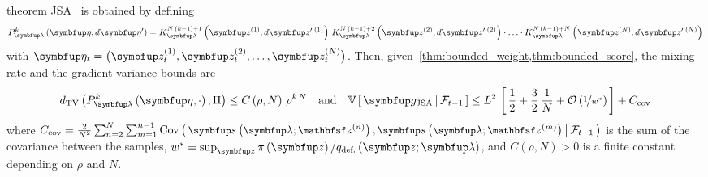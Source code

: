 
\begin{theoremEnd}{theorem}\label{thm:jsa}
  JSA~\citep{pmlr-v124-ou20a} is obtained by defining 
  {%
  \begin{align*}
  P_{\vlambda}^k\left(\veta, d\veta^{\prime}\right)
  = 
  K_{\vlambda}^{N\,\left(k-1\right) + 1}\left(\vz^{(1)}, d\vz^{\prime\;(1)}\right)
  \,
  K_{\vlambda}^{N\,\left(k-1\right) + 2}\left(\vz^{(2)}, d\vz^{\prime\;(2)}\right)
  \cdot
  \ldots 
  \cdot
  K_{\vlambda}^{N\,\left(k-1\right) + N}\left(\vz^{(N)}, d\vz^{\prime\;(N)}\right)
  \end{align*}
  }%
  with \(\veta_t = \big(\vz_t^{(1)}, \vz_t^{(2)}, \ldots, \vz_t^{(N)}\big)\).
  Then, given~\cref{thm:bounded_weight,thm:bounded_score}, the mixing rate and the gradient variance bounds are
  {%
  \begin{align*}
    \DTV{P_{\vlambda}^k\left(\veta, \cdot\right)}{\Pi}
    \leq
    C\left(\rho, N\right)\,{\rho}^{k\,N}
    \quad\text{and}\quad
    \V{ \vg_{\mathrm{JSA}} \,\middle|\, \mathcal{F}_{t-1} }
    \leq
    L^2 \,
    \left[\,
    \frac{1}{2} + \frac{3}{2}\,\frac{1}{N}
    + \mathcal{O}\left(\nicefrac{1}{w^*}\right)
    \,\right]
    +
    C_{\text{cov}}
  \end{align*}
  }%
  where
  \(\small\textstyle
  C_{\text{cov}} = \frac{2}{N^2} \sum^{N}_{n=2} \sum^{n-1}_{m = 1} \Cov{\vs\left(\vlambda; \rvvz^{(n)}\right), \vs\left(\vlambda; \rvvz^{(m)}\right) \,\middle|\, \mathcal{F}_{t-1} }
  \) is the sum of the covariance between the samples, \(w^* = \sup_{\vz} \pi\left(\vz\right) / q_{\text{def.}}\left(\vz;\vlambda\right)\), and \(C\left(\rho, N\right) > 0\) is a finite constant depending on \(\rho\) and \(N\).
\end{theoremEnd}
